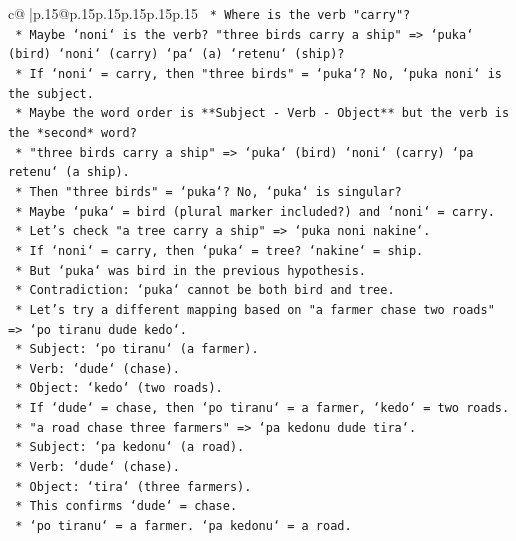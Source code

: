 \documentclass{article}
\begin{document}
{\begin{supertabular}{c@{$\;$}|p{.15\linewidth}@{}p{.15\linewidth}p{.15\linewidth}p{.15\linewidth}p{.15\linewidth}p{.15\linewidth}}
{{{\texttt{                *   Where is the verb "carry"?} \\
\texttt{                *   Maybe `noni` is the verb? "three birds carry a ship" => `puka` (bird) `noni` (carry) `pa` (a) `retenu` (ship)?} \\
\texttt{                *   If `noni` = carry, then "three birds" = `puka`? No, `puka noni` is the subject.} \\
\texttt{                *   Maybe the word order is **Subject {-} Verb {-} Object** but the verb is the *second* word?} \\
\texttt{                *   "three birds carry a ship" => `puka` (bird) `noni` (carry) `pa retenu` (a ship).} \\
\texttt{                *   Then "three birds" = `puka`? No, `puka` is singular?} \\
\texttt{                *   Maybe `puka` = bird (plural marker included?) and `noni` = carry.} \\
\texttt{                *   Let's check "a tree carry a ship" => `puka noni nakine`.} \\
\texttt{                *   If `noni` = carry, then `puka` = tree? `nakine` = ship.} \\
\texttt{                *   But `puka` was bird in the previous hypothesis.} \\
\texttt{                *   Contradiction: `puka` cannot be both bird and tree.} \\
\texttt{    *   Let's try a different mapping based on "a farmer chase two roads" => `po tiranu dude kedo`.} \\
\texttt{        *   Subject: `po tiranu` (a farmer).} \\
\texttt{        *   Verb: `dude` (chase).} \\
\texttt{        *   Object: `kedo` (two roads).} \\
\texttt{        *   If `dude` = chase, then `po tiranu` = a farmer, `kedo` = two roads.} \\
\texttt{        *   "a road chase three farmers" => `pa kedonu dude tira`.} \\
\texttt{        *   Subject: `pa kedonu` (a road).} \\
\texttt{        *   Verb: `dude` (chase).} \\
\texttt{        *   Object: `tira` (three farmers).} \\
\texttt{        *   This confirms `dude` = chase.} \\
\texttt{        *   `po tiranu` = a farmer. `pa kedonu` = a road.} \\
}}}
\end{supertabular}}
\end{document}
